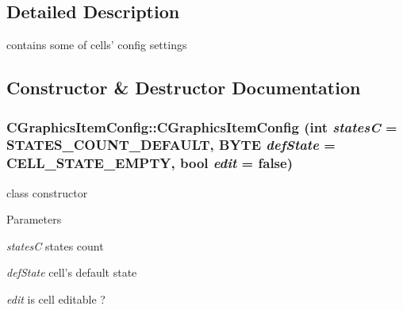 \subsection{Detailed Description}
contains some of cells' config settings 

\subsection{Constructor \& Destructor Documentation}
\hypertarget{classCGraphicsItemConfig_a33b7af5ae08da16f731f51885fda91d3}{
\subsubsection[{CGraphicsItemConfig}]{\setlength{\rightskip}{0pt plus 5cm}CGraphicsItemConfig::CGraphicsItemConfig (int {\em statesC} = {\ttfamily STATES\_\-COUNT\_\-DEFAULT}, \/  BYTE {\em defState} = {\ttfamily CELL\_\-STATE\_\-EMPTY}, \/  bool {\em edit} = {\ttfamily false})}}
\label{classCGraphicsItemConfig_a33b7af5ae08da16f731f51885fda91d3}
class constructor


\begin{DoxyParams}{Parameters}
\item[{\em statesC}]states count \item[{\em defState}]cell's default state \item[{\em edit}]is cell editable ? \end{DoxyParams}


